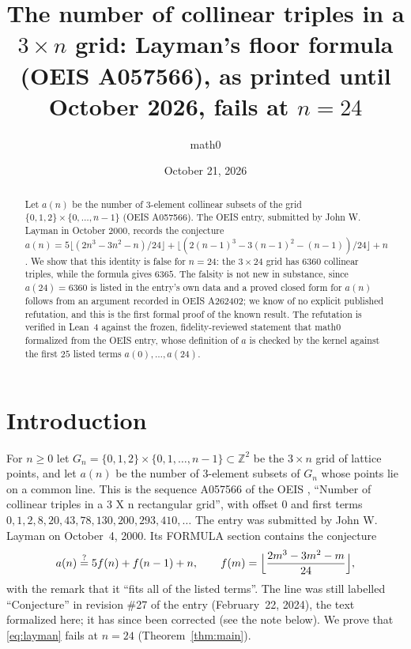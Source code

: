 \documentclass[11pt]{amsart}
\title[Layman's formula for collinear triples in a $3\times n$ grid fails]{The number of collinear triples in a $3\times n$ grid: Layman's floor formula (OEIS A057566), as printed until October 2026, fails at $n=24$}
\author{math0}
\date{October 21, 2026}
\theoremstyle{plain}
\theoremstyle{definition}
\newcommand{\Z}{\mathbb{Z}}
\begin{document}
\begin{abstract}
Let $a(n)$ be the number of $3$-element collinear subsets of the grid $\{0,1,2\}\times\{0,\dots,n-1\}$ (OEIS A057566).
The OEIS entry, submitted by John W. Layman in October 2000, records the conjecture $a(n)=5\lfloor(2n^3-3n^2-n)/24\rfloor+\lfloor(2(n-1)^3-3(n-1)^2-(n-1))/24\rfloor+n$.
We show that this identity is false for $n=24$: the $3\times 24$ grid has $6360$ collinear triples, while the formula gives $6365$.
The falsity is not new in substance, since $a(24)=6360$ is listed in the entry's own data and a proved closed form for $a(n)$ follows from an argument recorded in OEIS A262402; we know of no explicit published refutation, and this is the first formal proof of the known result.
The refutation is verified in Lean~4 against the frozen, fidelity-reviewed statement that math0 formalized from the OEIS entry, whose definition of $a$ is checked by the kernel against the first $25$ listed terms $a(0),\dots,a(24)$.
\end{abstract}
\maketitle

\section{Introduction}

For $n\ge0$ let $G_n=\{0,1,2\}\times\{0,1,\dots,n-1\}\subset\Z^2$ be the $3\times n$ grid of lattice points, and let $a(n)$ be the number of $3$-element subsets of $G_n$ whose points lie on a common line.
This is the sequence A057566 of the OEIS \cite{A057566}, ``Number of collinear triples in a 3 X n rectangular grid'', with offset $0$ and first terms $0, 1, 2, 8, 20, 43, 78, 130, 200, 293, 410,\dots$
The entry was submitted by John W. Layman on October~4, 2000. Its FORMULA section contains the conjecture
\begin{equation}\label{eq:layman}
  a(n)\overset{?}{=}5f(n)+f(n-1)+n,\qquad f(m)=\Bigl\lfloor\frac{2m^3-3m^2-m}{24}\Bigr\rfloor,
\end{equation}
with the remark that it ``fits all of the listed terms''. The line was still labelled ``Conjecture'' in revision \#27 of the entry (February~22, 2024), the text formalized here; it has since been corrected (see the note below).
We prove that \eqref{eq:layman} fails at $n=24$ (Theorem~\ref{thm:main}).
\end{document}
